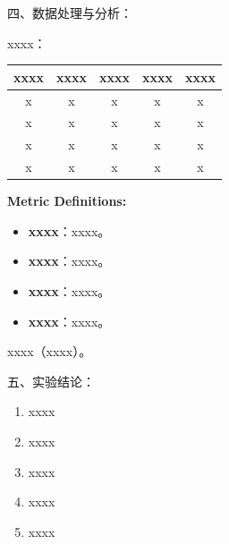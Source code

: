 \documentclass[12pt, a4paper]{article}
\begin{document}
\begin{labbox}{四、数据处理与分析：}{}

xxxx：

\vspace{0.3cm}
\begin{center}
\begin{tabular}{|c|c|c|c|c|}
    \hline
    \textbf{xxxx} & \textbf{xxxx} & \textbf{xxxx} & \textbf{xxxx} & \textbf{xxxx} \\
    \hline
    x & x & x & x & x \\
    x & x & x & x & x \\
    x & x & x & x & x \\
    x & x & x & x & x \\
    \hline
\end{tabular}
\end{center}
\vspace{0.3cm}

\textbf{Metric Definitions:}
\begin{itemize}[leftmargin=2em, itemsep=0.2em]
    \item \textbf{xxxx}：xxxx。
    \item \textbf{xxxx}：xxxx。
    \item \textbf{xxxx}：xxxx。
    \item \textbf{xxxx}：xxxx。
\end{itemize}

\vspace{0.2cm}
xxxx（xxxx）。

\end{labbox}


\newpage
\begin{labbox}{五、实验结论：}{}

\begin{enumerate}[leftmargin=2em, itemsep=0.4em]
    \item xxxx
    \item xxxx
    \item xxxx
    \item xxxx
    \item xxxx
\end{enumerate}

\end{labbox}
\end{document}
